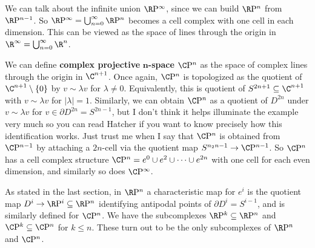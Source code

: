 \begin{example}
    We can talk about the infinite union $\R\mathrm P^{\infty}$, since we can build $\R\mathrm P^n $ from $\R\mathrm P^{n-1}$. So $\R\mathrm P^{\infty}=\bigcup_{n=0}^{\infty} \R\mathrm P^n $ becomes a cell complex with one cell in each dimension. This can be viewed as the space of lines through the origin in $\R^{\infty}=\bigcup_{n=0} ^{\infty}\R^n $.
\end{example}
\begin{example}
    We can define \textbf{complex projective} $\mathbf{n}$\textbf{-space} $\C\mathrm P^n $ as the space of complex lines through the origin in $\C^{n+1}$. Once again, $\C\mathrm P^n $ is topologized as the quotient of $\C^{n+1}\setminus \{0\} $ by $v\sim \lambda v$ for $\lambda\neq 0$. Equivalently, this is quotient of $S^{2n+1}\subseteq \C^{n+1}$ with $v\sim \lambda v$ for $|\lambda|=1$. Similarly, we can obtain $\C\mathrm P^n $ as a quotient of $D^{2n}$ under $v\sim \lambda v$ for $v\in \partial D^{2n}=S^{2n-1}$, but I don't think it helps illuminate the example very much so you can read Hatcher if you want to know precisely how this identification works. Just trust me when I say that $\C\mathrm P^n $ is obtained from $\C\mathrm P^{n-1}$ by attaching a $2n$-cell via the quotient map $S^{n_2n-1}\to \C \mathrm P^{n-1}$. So $\C\mathrm P^n $ has a cell complex structure $\C\mathrm P^n=e^0\cup e^2\cup \cdots \cup e^{2n} $ with one cell for each even dimension, and similarly so does $\C\mathrm P^{\infty}$.
\end{example}
\begin{example}
    As stated in the last section, in $\R\mathrm P^n $ a characteristic map for $e^i $ is the quotient map $D^i \to \R\mathrm P^i \subseteq \R\mathrm P^n $ identifying antipodal points of $\partial D^i =S^{i-1}$, and is similarly defined for $\C\mathrm P^n $. We have the subcomplexes $\R\mathrm P^k\subseteq \R\mathrm P^n $ and $\C\mathrm P^k\subseteq \C\mathrm P^n$ for $k\leq n$. These turn out to be the only subcomplexes of $\R\mathrm P^n$ and $\C\mathrm P^n$.
\end{example}
